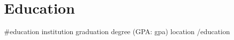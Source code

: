 \vspace{-10pt}
\section{Education}
    \resumeSubHeadingListStart

{{#education}}
    \resumeSubheading
    { {{{institution}}} }{ {{{graduation}}} }
    { {{{degree}}} (GPA: {{{gpa}}}) }{ {{{location}}} }
    \resumeItemListStart
    \resumeItemListEnd
{{/education}}
    \resumeSubHeadingListEnd